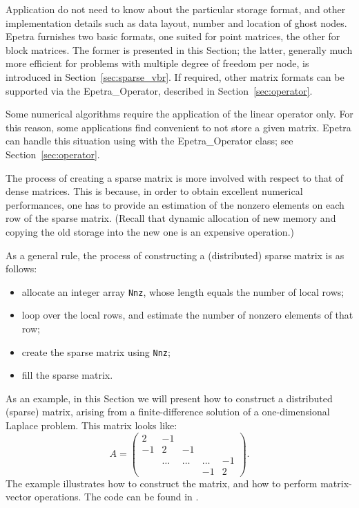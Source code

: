 Application do not need to know about the particular storage format, and
other implementation details such as data layout, number and location of
ghost nodes. Epetra furnishes two basic formats, one suited for point
matrices, the other for block matrices. The former is presented in this
Section; the latter, generally much more efficient for problems with
multiple degree of freedom per node, is introduced in
Section~\ref{sec:sparse_vbr}. If required, other matrix formats can be
supported via the Epetra\_Operator, described in
Section~\ref{sec:operator}.

\begin{remark}
Some numerical algorithms require  the application of the linear
operator only. For this reason, some applications find convenient to not
store a given matrix. Epetra can handle this situation using with the
Epetra\_Operator class; see Section~\ref{sec:operator}.
\end{remark}

The process of creating a sparse matrix is more involved with respect to
that of dense matrices. This is because, in order to obtain excellent
numerical performances, one has to provide an estimation of the nonzero
elements on each row of the sparse matrix. (Recall that dynamic
allocation of new memory and copying the old storage into the new one is
an expensive operation.) 

As a general rule, the process of constructing a (distributed) sparse
matrix is as follows:
\begin{itemize}
\item allocate an integer array \verb!Nnz!, whose length equals the
  number of local rows;
\item loop over the local rows, and estimate the number of nonzero
  elements of that row;
\item create the sparse matrix using \verb!Nnz!;
\item fill the sparse matrix.
\end{itemize}

As an example, in this Section we will present how to construct a
distributed (sparse) matrix, arising from a finite-difference solution
of a one-dimensional Laplace problem. This matrix looks like:
\begin{equation*}
A = \begin{pmatrix}
 2 & -1 &     &   &    \\
-1 &  2     & -1     &        &    \\
   & \ldots & \ldots & \ldots & -1 \\
   &        &        & -1     & 2
\end{pmatrix}.
\end{equation*}
The example illustrates how to construct the matrix,
and how to perform matrix-vector operations.
The code can be found in .

